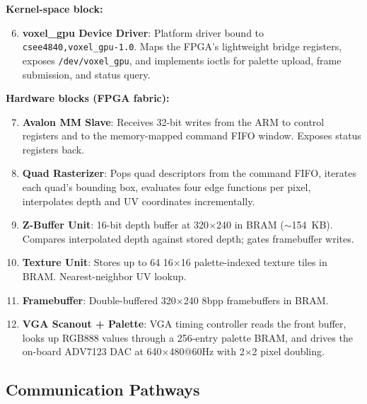 \documentclass[11pt]{article}
\begin{document}
\textbf{Kernel-space block:}

\begin{enumerate}
\setcounter{enumi}{5}
\item \textbf{voxel\_gpu Device Driver}: Platform driver bound to \texttt{csee4840,voxel\_gpu-1.0}. Maps the FPGA's lightweight bridge registers, exposes \texttt{/dev/voxel\_gpu}, and implements ioctls for palette upload, frame submission, and status query.
\end{enumerate}

\textbf{Hardware blocks (FPGA fabric):}

\begin{enumerate}
\setcounter{enumi}{6}
\item \textbf{Avalon MM Slave}: Receives 32-bit writes from the ARM to control registers and to the memory-mapped command FIFO window. Exposes status registers back.

\item \textbf{Quad Rasterizer}: Pops quad descriptors from the command FIFO, iterates each quad's bounding box, evaluates four edge functions per pixel, interpolates depth and UV coordinates incrementally.

\item \textbf{Z-Buffer Unit}: 16-bit depth buffer at 320$\times$240 in BRAM ($\sim$154~KB). Compares interpolated depth against stored depth; gates framebuffer writes.

\item \textbf{Texture Unit}: Stores up to 64 16$\times$16 palette-indexed texture tiles in BRAM. Nearest-neighbor UV lookup.

\item \textbf{Framebuffer}: Double-buffered 320$\times$240 8bpp framebuffers in BRAM.

\item \textbf{VGA Scanout + Palette}: VGA timing controller reads the front buffer, looks up RGB888 values through a 256-entry palette BRAM, and drives the on-board ADV7123 DAC at 640$\times$480@60Hz with 2$\times$2 pixel doubling.
\end{enumerate}

\subsection{Communication Pathways}
\end{document}
